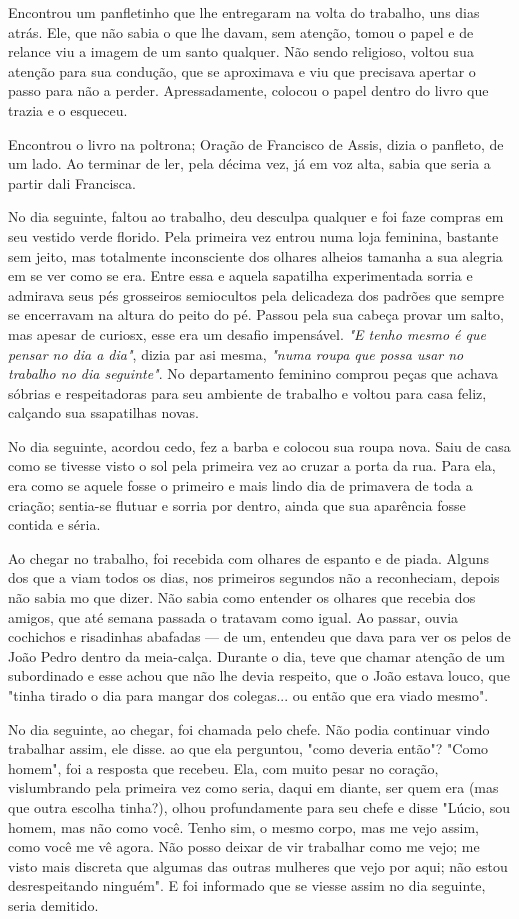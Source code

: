 \documentclass[11pt,a4paper,twoside,openany]{book}
\begin{document}
Encontrou um panfletinho que lhe entregaram na volta do trabalho, uns dias atrás. Ele, que não sabia o que lhe davam, sem atenção, tomou o papel e de relance viu a imagem de um santo qualquer. Não sendo religioso, voltou sua atenção para sua condução, que se aproximava e viu que precisava apertar o passo para não a perder. Apressadamente, colocou o papel dentro do livro que trazia e o esqueceu.

Encontrou o livro na poltrona; Oração de Francisco de Assis, dizia o panfleto, de um lado. Ao terminar de ler, pela décima vez, já em voz alta, sabia que seria a partir dali Francisca.

No dia seguinte, faltou ao trabalho, deu desculpa qualquer e foi faze  compras em seu vestido verde florido. Pela primeira vez entrou numa loja feminina, bastante sem jeito, mas totalmente inconsciente dos olhares alheios tamanha a sua alegria em se ver como se era. Entre essa e aquela sapatilha experimentada sorria e admirava seus pés grosseiros semiocultos pela delicadeza dos padrões que sempre se encerravam na altura do peito do pé. Passou pela sua cabeça provar um salto, mas apesar de curiosx, esse era um desafio impensável. \emph{"E tenho mesmo é que pensar no dia a dia"}, dizia par asi mesma, \emph{"numa roupa que possa usar no trabalho no dia seguinte"}. No departamento feminino comprou peças que achava sóbrias e respeitadoras para seu ambiente de trabalho e voltou para casa feliz, calçando sua ssapatilhas novas.

No dia seguinte, acordou cedo, fez a barba e colocou sua roupa nova. Saiu de casa como se tivesse visto o sol pela primeira vez ao cruzar a porta da rua. Para ela, era como se aquele fosse o primeiro e mais lindo dia de primavera de toda a criação; sentia-se flutuar e sorria por dentro, ainda que sua aparência fosse contida e séria.

Ao chegar no trabalho, foi recebida com olhares de espanto e de piada. Alguns dos que a viam todos os dias, nos primeiros segundos não a reconheciam, depois não sabia mo que dizer. Não sabia como entender os olhares que recebia dos amigos, que até semana passada o tratavam como igual. Ao passar, ouvia cochichos e risadinhas abafadas --- de um, entendeu que dava para ver os pelos de João Pedro dentro da meia-calça. Durante o dia, teve que chamar atenção de um subordinado e esse achou que não lhe devia respeito, que o João estava louco, que "tinha tirado o dia para mangar dos colegas... ou então que era viado mesmo".

No dia seguinte, ao chegar, foi chamada pelo chefe. Não podia continuar vindo trabalhar assim, ele disse. ao que ela perguntou, "como deveria então"? "Como homem", foi a resposta que recebeu. Ela, com muito pesar no coração, vislumbrando pela primeira vez como seria, daqui em diante, ser quem era (mas que outra escolha tinha?), olhou profundamente para seu chefe e disse "Lúcio, sou homem, mas não como você. Tenho sim, o mesmo corpo, mas me vejo assim, como você me vê agora. Não posso deixar de vir trabalhar como me vejo; me visto mais discreta que algumas das outras mulheres que vejo por aqui; não estou desrespeitando ninguém". E foi informado que se viesse assim no dia seguinte, seria demitido.
\end{document}
